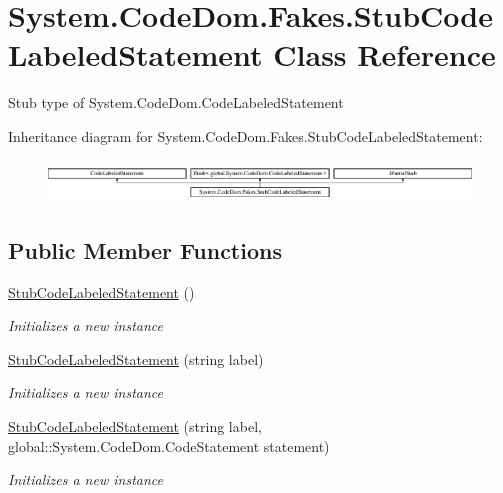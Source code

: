 \hypertarget{class_system_1_1_code_dom_1_1_fakes_1_1_stub_code_labeled_statement}{\section{System.\-Code\-Dom.\-Fakes.\-Stub\-Code\-Labeled\-Statement Class Reference}
\label{class_system_1_1_code_dom_1_1_fakes_1_1_stub_code_labeled_statement}
}


Stub type of System.\-Code\-Dom.\-Code\-Labeled\-Statement 


Inheritance diagram for System.\-Code\-Dom.\-Fakes.\-Stub\-Code\-Labeled\-Statement\-:\begin{figure}[H]
\begin{center}
\leavevmode
\includegraphics[height=1.091618cm]{class_system_1_1_code_dom_1_1_fakes_1_1_stub_code_labeled_statement}
\end{center}
\end{figure}
\subsection*{Public Member Functions}
\begin{DoxyCompactItemize}
\item 
\hyperlink{class_system_1_1_code_dom_1_1_fakes_1_1_stub_code_labeled_statement_ab873ee78d74c904ea2ca372824f7c26d}{Stub\-Code\-Labeled\-Statement} ()
\begin{DoxyCompactList}\small\item\em Initializes a new instance\end{DoxyCompactList}\item 
\hyperlink{class_system_1_1_code_dom_1_1_fakes_1_1_stub_code_labeled_statement_a6f1d9e7fae8d91777f816d45f2c76d09}{Stub\-Code\-Labeled\-Statement} (string label)
\begin{DoxyCompactList}\small\item\em Initializes a new instance\end{DoxyCompactList}\item 
\hyperlink{class_system_1_1_code_dom_1_1_fakes_1_1_stub_code_labeled_statement_a4c22ba931c7a4090808bc53bead91b32}{Stub\-Code\-Labeled\-Statement} (string label, global\-::\-System.\-Code\-Dom.\-Code\-Statement statement)
\begin{DoxyCompactList}\small\item\em Initializes a new instance\end{DoxyCompactList}\end{DoxyCompactItemize}
